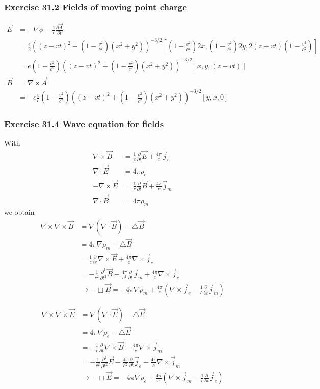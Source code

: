 \documentclass[10pt,a4paper]{book}
\theoremstyle{definition}
\begin{document}
\subsubsection{Exercise 31.2 Fields of moving point charge}
\begin{align}
	\vec{E}&=-\nabla\phi-\frac{1}{c}\frac{\partial\vec{A}}{\partial t}\\
	&=\frac{e}{2}\left((z-vt)^2+(1-\frac{v^2}{c^2})(x^2+y^2)\right)^{-3/2}[(1-\frac{v^2}{c^2})2x,(1-\frac{v^2}{c^2})2y,2(z-vt)(1-\frac{v^2}{c^2})]\\
	&=e(1-\frac{v^2}{c^2})\left((z-vt)^2+(1-\frac{v^2}{c^2})(x^2+y^2)\right)^{-3/2}[x,y,(z-vt)]\\
	\vec{B}&=\nabla\times\vec{A}\\
	&=-e\frac{v}{c}(1-\frac{v^2}{c^2})\left((z-vt)^2+(1-\frac{v^2}{c^2})(x^2+y^2)\right)^{-3/2}[y,x,0]
\end{align}

\subsubsection{Exercise 31.4 Wave equation for fields}
With
\begin{align}
\nabla\times\vec{B}&=\frac{1}{c}\frac{\partial}{\partial t}\vec{E}+\frac{4\pi}{c}\vec{j}_e\\
\nabla\cdot\vec{E}&=4\pi\rho_e\\
-\nabla\times\vec{E}&=\frac{1}{c}\frac{\partial}{\partial t}\vec{B}+\frac{4\pi}{c}\vec{j}_m\\
\nabla\cdot\vec{B}&=4\pi\rho_m
\end{align}
we obtain
\begin{align}
\nabla\times\nabla\times\vec{B}
&=\nabla(\nabla\cdot\vec{B})-\triangle\vec{B}\\
&=4\pi\nabla\rho_m-\triangle\vec{B}\\
&=\frac{1}{c}\frac{\partial}{\partial t}\nabla\times\vec{E}+\frac{4\pi}{c}\nabla\times\vec{j}_e\\
&=-\frac{1}{c^2}\frac{\partial^2}{\partial t^2}\vec{B}-\frac{4\pi}{c^2}\frac{\partial}{\partial t}\vec{j}_m+\frac{4\pi}{c}\nabla\times\vec{j}_e\\
&\rightarrow-\Box\vec{B}=-4\pi\nabla\rho_m+\frac{4\pi}{c}(\nabla\times\vec{j}_e-\frac{1}{c}\frac{\partial}{\partial t}\vec{j}_m)
\end{align}

\begin{align}
\nabla\times\nabla\times\vec{E}
&=\nabla(\nabla\cdot\vec{E})-\triangle\vec{E}\\
&=4\pi\nabla\rho_e-\triangle\vec{E}\\
&=-\frac{1}{c}\frac{\partial}{\partial t}\nabla\times\vec{B}-\frac{4\pi}{c}\nabla\times\vec{j}_m\\
&=-\frac{1}{c^2}\frac{\partial^2}{\partial t^2}\vec{E}-\frac{4\pi}{c^2}\frac{\partial}{\partial t}\vec{j}_e-\frac{4\pi}{c}\nabla\times\vec{j}_m\\
&\rightarrow-\Box\vec{E}=-4\pi\nabla\rho_e+\frac{4\pi}{c}(\nabla\times\vec{j}_m-\frac{1}{c}\frac{\partial}{\partial t}\vec{j}_e)
\end{align}
\end{document}
